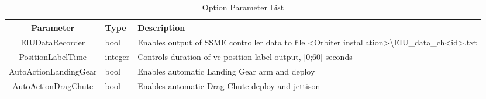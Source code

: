 \documentclass[Space_Shuttle_Vessel_Manual.tex]{subfiles}
\begin{document}
\begin{table}[H]
  \centering
  \begin{tabularx}{470pt}{c | >{\centering\arraybackslash}p{50pt} | >{\centering\arraybackslash}p{300pt}}
    \textbf{Parameter} & \textbf{Type} & \textbf{Description} \\
    \hline
	EIUDataRecorder & bool & Enables output of SSME controller data to file <Orbiter installation>\textbackslash EIU\_data\_ch<id>.txt\\
	\hline\rule{0pt}{2ex}
	PositionLabelTime & integer & Controls duration of vc position label output, [0;60] seconds\\
	\hline\rule{0pt}{2ex}
	AutoActionLandingGear & bool & Enables automatic Landing Gear arm and deploy\\
	\hline\rule{0pt}{2ex}
	AutoActionDragChute & bool & Enables automatic Drag Chute deploy and jettison
	\end{tabularx}
  \caption{Option Parameter List}
  \label{tab:OptionParameterList}
\end{table}
\end{document}
